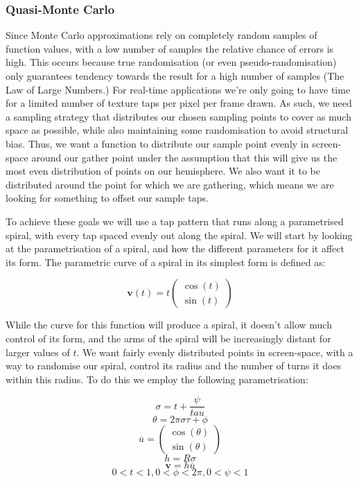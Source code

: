 \subsubsection{Quasi-Monte Carlo}
Since Monte Carlo approximations rely on completely random samples of function values, with a low number of samples the relative chance of errors is high. This occurs because true randomisation (or even pseudo-randomisation) only guarantees tendency towards the result for a high number of samples (The Law of Large Numbers.) For real-time applications we're only going to have time for a limited number of texture taps per pixel per frame drawn. As such, we need a sampling strategy that distributes our chosen sampling points to cover as much space as possible, while also maintaining some randomisation to avoid structural bias. Thus, we want a function to distribute our sample point evenly in screen-space around our gather point under the assumption that this will give us the most even distribution of points on our hemisphere. We also want it to be distributed around the point for which we are gathering, which means we are looking for something to offset our sample taps.

To achieve these goals we will use a tap pattern that runs along a parametrised spiral, with every tap spaced evenly out along the spiral. We will start by looking at the parametrisation of a spiral, and how the different parameters for it affect its form. The parametric curve of a spiral in its simplest form is defined as:

$$\mathbf{v}(t) = t \begin{pmatrix}\cos(t) \\ \sin(t) \end{pmatrix}$$

While the curve for this function will produce a spiral, it doesn't allow much control of its form, and the arms of the spiral will be increasingly distant for larger values of $t$. We want fairly evenly distributed points in screen-space, with a way to randomise our spiral, control its radius and the number of turns it does within this radius. To do this we employ the following parametrisation:\cite{deep-g-buffer}

$$\sigma = t + \frac{\psi}{tau} $$
$$\theta = 2\pi\sigma\tau + \phi $$
$$\overline{u} = \begin{pmatrix}\cos(\theta) \\ \sin(\theta) \end{pmatrix} $$
$$h = R \sigma $$
$$\mathbf{v} = h \overline{u}$$
$$0 < t < 1, 0 < \phi < 2\pi, 0 < \psi < 1$$

